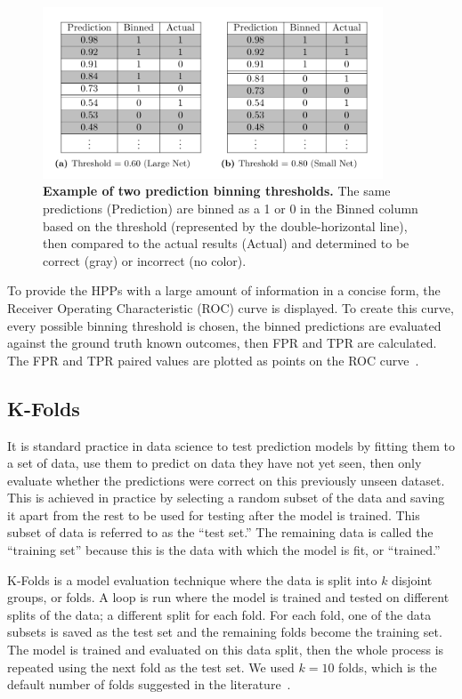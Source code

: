 \documentclass[10pt,letterpaper]{article}
\begin{document}
\begin{figure}[!h]
    \centering
    \includegraphics[width=0.9\textwidth]{Fig3.png} %
    \caption{{\bf Example of two prediction binning thresholds.} The same predictions (Prediction) are binned as a 1 or 0 in the Binned column based on the threshold (represented by the double-horizontal line), then compared to the actual results (Actual) and determined to be correct (gray) or incorrect (no color).}
    \label{fig:threshold_example}
\end{figure}

To provide the HPPs with a large amount of information in a concise form, the Receiver Operating Characteristic (ROC) curve is displayed. To create this curve, every possible binning threshold is chosen, the binned predictions are evaluated against the ground truth known outcomes, then FPR and TPR are calculated. The FPR and TPR paired values are plotted as points on the ROC curve~\cite{fawcett2006introduction}.

\subsection*{K-Folds}
It is standard practice in data science to test prediction models by fitting them to a set of data, use them to predict on data they have not yet seen, then only evaluate whether the predictions were correct on this previously unseen dataset. This is achieved in practice by selecting a random subset of the data and saving it apart from the rest to be used for testing after the model is trained. This subset of data is referred to as the ``test set.'' The remaining data is called the ``training set'' because this is the data with which the model is fit, or ``trained.'' 

K-Folds is a model evaluation technique where the data is split into $k$ disjoint groups, or folds. A loop is run where the model is trained and tested on different splits of the data; a different split for each fold. For each fold, one of the data subsets is saved as the test set and the remaining folds become the training set. The model is trained and evaluated on this data split, then the whole process is repeated using the next fold as the test set. We used $k = 10$ folds, which is the default number of folds suggested in the literature~\cite{marcot2020optimal}.
\end{document}
